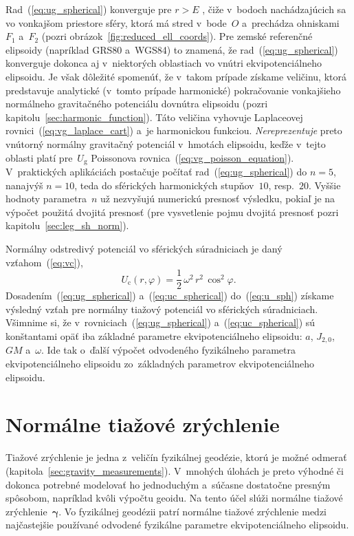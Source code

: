 \documentclass[a4paper, 12pt]{book}
\newcommand{\gidx}{\mathrm g}
\newcommand{\cidx}{\mathrm c}
\begin{document}
Rad~(\ref{eq:ug_spherical}) konverguje pre $r > E$ 
\parencite{MoritzAdvancedGeodesy}, čiže v~bodoch nachádzajúcich sa vo vonkajšom 
priestore sféry, ktorá má stred v~bode~$O$ a~prechádza ohniskami $F_1$ a~$F_2$ 
(pozri obrázok~\ref{fig:reduced_ell_coords}).  Pre zemské referenčné elipsoidy 
(napríklad GRS80 a~WGS84) to znamená, že rad~(\ref{eq:ug_spherical}) konverguje 
dokonca aj v~niektorých oblastiach vo vnútri ekvipotenciálneho elipsoidu.  Je 
však dôležité spomenúť, že v~takom prípade získame veličinu, ktorá predstavuje 
analytické (v~tomto prípade harmonické) pokračovanie vonkajšieho normálneho 
gravitačného potenciálu dovnútra elipsoidu (pozri 
kapitolu~\ref{sec:harmonic_function}).  Táto veličina vyhovuje Laplaceovej 
rovnici~(\ref{eq:vg_laplace_cart}) a~je harmonickou funkciou.  
\emph{Nereprezentuje} preto vnútorný normálny gravitačný potenciál v~hmotách 
elipsoidu, keďže v~tejto oblasti platí pre~$U_\gidx$ Poissonova 
rovnica~(\ref{eq:vg_poisson_equation}).  V~praktických aplikáciách postačuje 
počítať rad~(\ref{eq:ug_spherical}) do $n = 5$, nanajvýš $n = 10$, teda do 
sférických harmonických stupňov~$10$, resp.~$20$.  Vyššie hodnoty parametra~$n$ 
už nezvyšujú numerickú presnosť výsledku, pokiaľ je na výpočet použitá dvojitá 
presnosť (pre vysvetlenie pojmu dvojitá presnosť pozri 
kapitolu~\ref{sec:leg_sh_norm}).

Normálny odstredivý potenciál vo sférických súradniciach je daný 
vzťahom~(\ref{eq:vc}),
%
\begin{equation}
\label{eq:uc_spherical}
U_\cidx(r, \varphi) = \frac{1}{2} \, \omega^2 \, r^2 \, \cos^2\varphi{.}
\end{equation}
%
Dosadením~(\ref{eq:ug_spherical}) a~(\ref{eq:uc_spherical}) do~(\ref{eq:u_sph}) 
získame výsledný vzťah pre normálny tiažový potenciál vo sférických 
súradniciach.  Všimnime si, že v~rovniciach~(\ref{eq:ug_spherical}) 
a~(\ref{eq:uc_spherical}) sú konštantami opäť iba základné parametre 
ekvipotenciálneho elipsoidu: $a$, $J_{2,0}$, $GM$ a~$\omega$.  Ide tak o~ďalší 
výpočet odvodeného fyzikálneho parametra ekvipotenciálneho elipsoidu 
zo~základných parametrov ekvipotenciálneho elipsoidu.



\section{Normálne tiažové zrýchlenie}
\label{sec:normal_gravity}

Tiažové zrýchlenie je jedna z~veličín fyzikálnej geodézie, ktorú je možné 
odmerať (kapitola~\ref{sec:gravity_measurements}).  V~mnohých úlohách je preto 
výhodné či dokonca potrebné modelovať ho jednoduchým a~súčasne dostatočne 
presným spôsobom, napríklad kvôli výpočtu geoidu.  Na tento účel slúži normálne 
tiažové zrýchlenie~$\boldsymbol\gamma$.  Vo fyzikálnej geodézii patrí normálne 
tiažové zrýchlenie medzi najčastejšie používané odvodené fyzikálne parametre 
ekvipotenciálneho elipsoidu.
\end{document}
